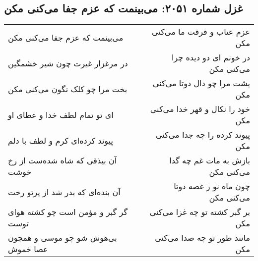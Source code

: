 \begin{center}
\section*{غزل شماره ۲۰۵۱: می‌بینمت که عزم جفا می‌کنی مکن}
\label{sec:2051}
\begin{longtable}{l p{0.5cm} r}
می‌بینمت که عزم جفا می‌کنی مکن
&&
عزم عتاب و فرقت ما می‌کنی مکن
\\
در مرغزار غیرت چون شیر خشمگین
&&
در خونم ای دو دیده چرا می‌کنی مکن
\\
بخت مرا چو کلک نگون می‌کنی مکن
&&
پشت مرا چو دال دوتا می‌کنی مکن
\\
ای تو تمام لطف خدا و عطای او
&&
خود را نکال و قهر خدا می‌کنی مکن
\\
پیوند کرده‌ای کرم و لطف با دلم
&&
پیوند کرده را چه جدا می‌کنی مکن
\\
آن بیذقی که شاه شده‌ست از رخ خوشت
&&
بازش به مات غم چه گدا می‌کنی مکن
\\
آن بنده‌ای که بدر شد از پرتو رخت
&&
چون ماه نو ز غصه دوتا می‌کنی مکن
\\
گر گبر و مؤمن است چو کشته هوای توست
&&
بر گبر کشته تو چه غزا می‌کنی مکن
\\
بی‌هوش شو چو موسی و همچون عصا خموش
&&
مانند طور تو چه صدا می‌کنی مکن
\\
\end{longtable}
\end{center}
